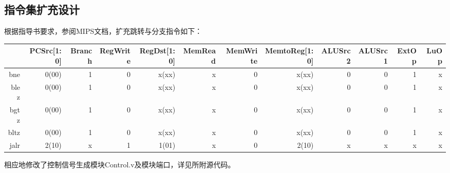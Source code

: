 \documentclass[10pt]{article}
\begin{document}
\subsection{指令集扩充设计}
根据指导书要求，参阅MIPS文档，扩充跳转与分支指令如下：
\begin{table}[h]
    \footnotesize
\begin{center}
    \begin{tabular}{|r|r|r|r|r|r|r|r|r|r|r|r|}
        \hline
        &PCSrc[1:0]& Branch & RegWrite & RegDst[1:0] & MemRead & MemWrite & MemtoReg[1:0] & ALUSrc2 & ALUSrc1 & ExtOp & LuOp\\
        \hline
        bne & 0(00) & 1 & 0 & x(xx) & x & 0 & x(xx) & 0 & 0 & 1 & x\\
        \hline
        blez& 0(00) & 1 & 0 & x(xx) & x & 0 & x(xx) & 0 & 0 & 1 & x\\
        \hline
        bgtz& 0(00) & 1 & 0 & x(xx) & x & 0 & x(xx) & 0 & 0 & 1 & x\\
        \hline
        bltz& 0(00) & 1 & 0 & x(xx) & x & 0 & x(xx) & 0 & 0 & 1 & x\\
        \hline
        jalr& 2(10) & x & 1 & 1(01) & x & 0 & 2(10) & x & x & x & x\\
        \hline
    \end{tabular}
\end{center}
\end{table}

相应地修改了控制信号生成模块Control.v及模块端口，详见所附源代码。
\end{document}
